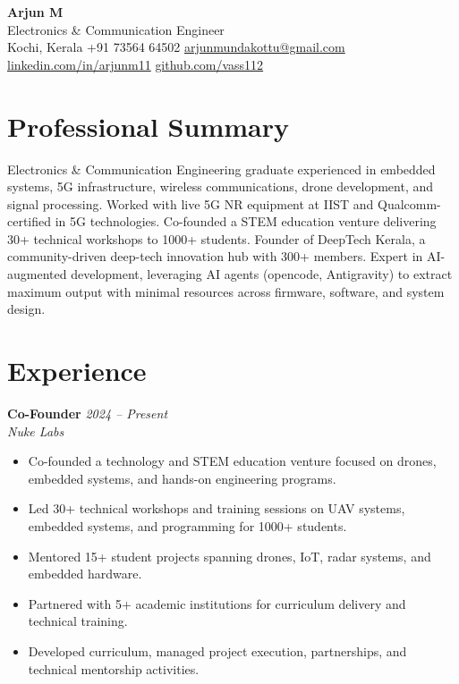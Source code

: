\documentclass[10pt,a4paper]{article}
\newcommand{\role}[2]{\textbf{#1} \hfill \textit{#2}}
\newcommand{\org}[2]{\textit{#1} \hfill #2}
\begin{document}
\begin{center}
    {\LARGE \textbf{Arjun M}} \\[3pt]
    {\small Electronics \& Communication Engineer} \\[2pt]
    {\small \faMapMarker* \hspace{0.3em} Kochi, Kerala \hspace{1.2em}
     \faPhone* \hspace{0.3em} +91 73564 64502 \hspace{1.2em}
     \faEnvelope \hspace{0.3em} \href{mailto:arjunmundakottu@gmail.com}{arjunmundakottu@gmail.com}} \\[2pt]
    {\small \faLinkedin \hspace{0.3em} \href{https://linkedin.com/in/arjunm11}{linkedin.com/in/arjunm11} \hspace{1.2em}
     \faGithub \hspace{0.3em} \href{https://github.com/vass112}{github.com/vass112}}
\end{center}

\vspace{2pt}

\section*{Professional Summary}

Electronics \& Communication Engineering graduate experienced in embedded systems, 5G infrastructure, wireless communications, drone development, and signal processing. Worked with live 5G NR equipment at IIST and Qualcomm-certified in 5G technologies. Co-founded a STEM education venture delivering 30+ technical workshops to 1000+ students. Founder of DeepTech Kerala, a community-driven deep-tech innovation hub with 300+ members. Expert in AI-augmented development, leveraging AI agents (opencode, Antigravity) to extract maximum output with minimal resources across firmware, software, and system design.

\section*{Experience}

\role{Co-Founder}{2024 -- Present} \\
\org{Nuke Labs}{}
\begin{itemize}
    \item Co-founded a technology and STEM education venture focused on drones, embedded systems, and hands-on engineering programs.
    \item Led 30+ technical workshops and training sessions on UAV systems, embedded systems, and programming for 1000+ students.
    \item Mentored 15+ student projects spanning drones, IoT, radar systems, and embedded hardware.
    \item Partnered with 5+ academic institutions for curriculum delivery and technical training.
    \item Developed curriculum, managed project execution, partnerships, and technical mentorship activities.
\end{itemize}
\end{document}

